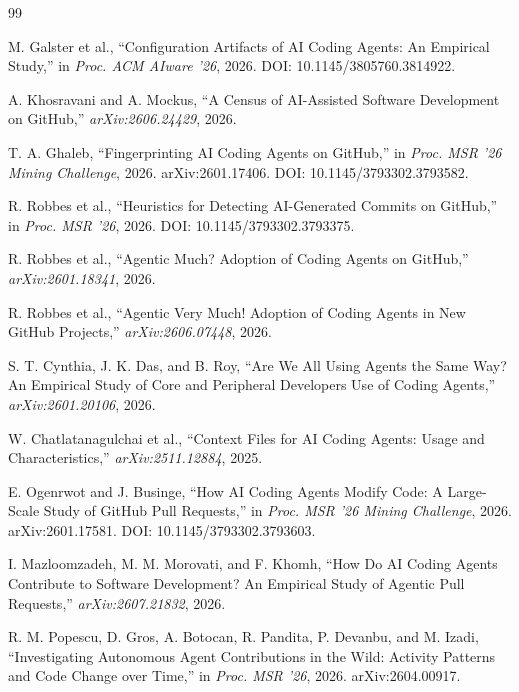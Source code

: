 \documentclass[11pt,a4paper]{article}
\begin{document}
\begin{thebibliography}{99}

M. Galster et al.,
``Configuration Artifacts of AI Coding Agents: An Empirical Study,''
in \textit{Proc. ACM AIware '26}, 2026. DOI: 10.1145/3805760.3814922.

A. Khosravani and A. Mockus,
``A Census of AI-Assisted Software Development on GitHub,''
\textit{arXiv:2606.24429}, 2026.

T. A. Ghaleb,
``Fingerprinting AI Coding Agents on GitHub,''
in \textit{Proc. MSR '26 Mining Challenge}, 2026.
arXiv:2601.17406. DOI: 10.1145/3793302.3793582.

R. Robbes et al.,
``Heuristics for Detecting AI-Generated Commits on GitHub,''
in \textit{Proc. MSR '26}, 2026. DOI: 10.1145/3793302.3793375.

R. Robbes et al.,
``Agentic Much? Adoption of Coding Agents on GitHub,''
\textit{arXiv:2601.18341}, 2026.

R. Robbes et al.,
``Agentic Very Much! Adoption of Coding Agents in New GitHub Projects,''
\textit{arXiv:2606.07448}, 2026.

S. T. Cynthia, J. K. Das, and B. Roy,
``Are We All Using Agents the Same Way? An Empirical Study of Core and
Peripheral Developers Use of Coding Agents,''
\textit{arXiv:2601.20106}, 2026.

W. Chatlatanagulchai et al.,
``Context Files for AI Coding Agents: Usage and Characteristics,''
\textit{arXiv:2511.12884}, 2025.

E. Ogenrwot and J. Businge,
``How AI Coding Agents Modify Code: A Large-Scale Study of GitHub Pull Requests,''
in \textit{Proc. MSR '26 Mining Challenge}, 2026.
arXiv:2601.17581. DOI: 10.1145/3793302.3793603.

I. Mazloomzadeh, M. M. Morovati, and F. Khomh,
``How Do AI Coding Agents Contribute to Software Development?
An Empirical Study of Agentic Pull Requests,''
\textit{arXiv:2607.21832}, 2026.

R. M. Popescu, D. Gros, A. Botocan, R. Pandita, P. Devanbu, and M. Izadi,
``Investigating Autonomous Agent Contributions in the Wild:
Activity Patterns and Code Change over Time,''
in \textit{Proc. MSR '26}, 2026. arXiv:2604.00917.


\end{thebibliography}
\end{document}
